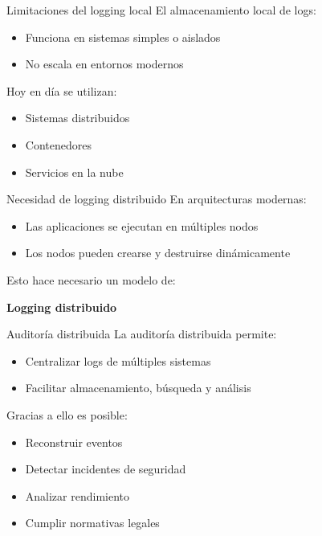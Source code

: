 \documentclass{beamer}
\begin{document}
\begin{frame}{Limitaciones del logging local}
El almacenamiento local de logs:
\begin{itemize}
    \item Funciona en sistemas simples o aislados
    \item No escala en entornos modernos
\end{itemize}

\vspace{0.3cm}
Hoy en día se utilizan:
\begin{itemize}
    \item Sistemas distribuidos
    \item Contenedores
    \item Servicios en la nube
\end{itemize}
\end{frame}

\begin{frame}{Necesidad de logging distribuido}
En arquitecturas modernas:
\begin{itemize}
    \item Las aplicaciones se ejecutan en múltiples nodos
    \item Los nodos pueden crearse y destruirse dinámicamente
\end{itemize}

\vspace{0.3cm}
Esto hace necesario un modelo de:
\begin{center}
\textbf{Logging distribuido}
\end{center}
\end{frame}

\begin{frame}{Auditoría distribuida}
La auditoría distribuida permite:
\begin{itemize}
    \item Centralizar logs de múltiples sistemas
    \item Facilitar almacenamiento, búsqueda y análisis
\end{itemize}

\vspace{0.3cm}
Gracias a ello es posible:
\begin{itemize}
    \item Reconstruir eventos
    \item Detectar incidentes de seguridad
    \item Analizar rendimiento
    \item Cumplir normativas legales
\end{itemize}
\end{frame}
\end{document}

